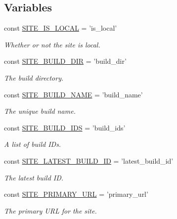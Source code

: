 \subsection*{Variables}
\begin{DoxyCompactItemize}
\item 
const \hyperlink{group__site__settings_ga5745a54a3d42630202e68e5b7a423e12}{S\-I\-T\-E\-\_\-\-I\-S\-\_\-\-L\-O\-C\-A\-L} = 'is\-\_\-local'
\begin{DoxyCompactList}\small\item\em Whether or not the site is local. \end{DoxyCompactList}\item 
const \hyperlink{group__site__settings_ga5135162217fc7ae791c74a52ecb45860}{S\-I\-T\-E\-\_\-\-B\-U\-I\-L\-D\-\_\-\-D\-I\-R} = 'build\-\_\-dir'
\begin{DoxyCompactList}\small\item\em The build directory. \end{DoxyCompactList}\item 
const \hyperlink{group__site__settings_ga125a82157d28745627ec431365175489}{S\-I\-T\-E\-\_\-\-B\-U\-I\-L\-D\-\_\-\-N\-A\-M\-E} = 'build\-\_\-name'
\begin{DoxyCompactList}\small\item\em The unique build name. \end{DoxyCompactList}\item 
const \hyperlink{group__site__settings_ga51a786d38e1ede6f5b887797b6f3d20d}{S\-I\-T\-E\-\_\-\-B\-U\-I\-L\-D\-\_\-\-I\-D\-S} = 'build\-\_\-ids'
\begin{DoxyCompactList}\small\item\em A list of build I\-Ds. \end{DoxyCompactList}\item 
const \hyperlink{group__site__settings_gafaa055bd264d0d16e8b6059cee84bfa4}{S\-I\-T\-E\-\_\-\-L\-A\-T\-E\-S\-T\-\_\-\-B\-U\-I\-L\-D\-\_\-\-I\-D} = 'latest\-\_\-build\-\_\-id'
\begin{DoxyCompactList}\small\item\em The latest build I\-D. \end{DoxyCompactList}\item 
const \hyperlink{group__site__settings_gaca2cffb6c087028f71b3f74193fe3778}{S\-I\-T\-E\-\_\-\-P\-R\-I\-M\-A\-R\-Y\-\_\-\-U\-R\-L} = 'primary\-\_\-url'
\begin{DoxyCompactList}\small\item\em The primary U\-R\-L for the site. \end{DoxyCompactList}\item 

\end{DoxyCompactItemize}
